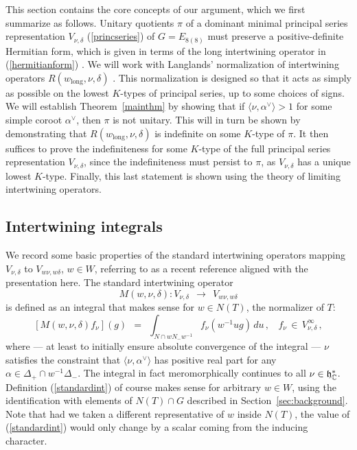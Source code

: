 \documentclass[12pt]{article}
\newcommand{\secref}[1]{Section~\ref{#1}}
\numberwithin{equation}{section}
\renewcommand\d{\delta}
\newcommand{\C}{{\mathbb{C}}}
\renewcommand\({\left(}
\renewcommand\){\right)}
\begin{document}
This section contains the core concepts of our argument, which we first summarize as follows.
Unitary quotients $\pi$ of a dominant minimal principal series representation $V_{\nu,\d}$ (\ref{princseries}) of $G=E_{8(8)}$  must preserve a positive-definite Hermitian form, which is given in terms of the long intertwining operator in (\ref{hermitianform}) \cite[\S4]{Vogan}. We will work with Langlands' normalization of intertwining operators $R(w_{\text{long}},\nu,\delta)$ \cite[Appendix II]{langlands}.  This normalization is designed so that it acts as simply as possible on the lowest $K$-types of principal series, up to some choices of signs.  We will establish Theorem~\ref{mainthm} by showing that if $\langle \nu,\alpha^\vee\rangle > 1$ for some simple coroot $\alpha^\vee$, then $\pi$ is not unitary.  This will in turn be shown by demonstrating that $R(w_{\text{long}},\nu,\delta)$ is indefinite on some $K$-type of $\pi$.  It then suffices to prove the indefiniteness for   some $K$-type of the full principal series representation $V_{\nu,\d}$, since the indefiniteness must persist to $\pi$, as
$V_{\nu,\d}$ has a unique lowest $K$-type.  Finally, this last statement is shown using the theory of limiting intertwining operators.



\subsection{Intertwining integrals}

We record some basic properties of the standard intertwining operators mapping $V_{\nu,\delta}$ to $V_{w\nu,w\delta}$, $w\in W$, referring to \cite[\S9]{Hundley-Miller} as a recent reference aligned with the presentation here.   The standard intertwining operator
\begin{equation}\label{mspaces}
M(w,\nu,\d)\colon V_{\nu,\d} \ \ \rightarrow \ \  V_{w\nu,w\delta}
\end{equation}
 is defined as an integral that makes sense for $w\in N(T)$, the normalizer of $T$:
\begin{equation}\label{standardint}
  [M(w,\nu,\delta)f_\nu](g) \ \ = \ \
 \int_{N\cap wN_{-}w^{-1}}f_\nu(w^{-1}ug)\, du\,, \ \ \ \ f_\nu \, \in\, V_{\nu,\d}^\infty\,,
\end{equation}
where  --- at least to initially ensure absolute convergence of the integral --- $\nu$ satisfies the constraint that $\langle \nu,\alpha^\vee\rangle$ has positive real part for any $\alpha\in\Delta_+\cap w^{-1}\Delta_{-}$.  The integral in fact meromorphically continues to all $\nu\in \frak h^*_\C$.  Definition (\ref{standardint}) of course makes sense for arbitrary $w\in W$, using the identification with elements of $N(T)\cap G$ described in \secref{sec:background}.  Note that had we taken a different representative of $w$ inside $N(T)$, the value of (\ref{standardint}) would only change by a scalar coming from the inducing character.
\end{document}
